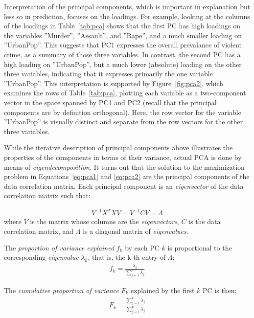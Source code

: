 Interpretation of the principal components, which is important in explanation but less so in prediction, focuses on the loadings. For example, looking at the columns of the loadings in Table~\ref{tab:pca} shows that the first PC has high loadings on the variables ''Murder'', ''Assault'', and ''Rape'', and a much smaller loading on ''UrbanPop''. This suggests that PC1 expresses the overall prevalance of violent crime, as a summary of those three variables. In contrast, the second PC has a high loading on ''UrbanPop'', but a much lower (absolute) loading on the other three variables, indicating that it expresses primarily the one variable ''UrbanPop''. This interpretation is supported by Figure~\ref{fig:pca2}, which examines the rows of Table~\ref{tab:pca}, plotting each variable as a two-component vector in the space spanned by PC1 and PC2 (recall that the principal components are by definition orthogonal). Here, the row vector for the variable ''UrbanPop'' is visually distinct and separate from the row vectors for the other three variables. 

While the iterative description of principal components above illustrates the properties of the components in terms of their variance, actual PCA is done by means of \emph{eigendecomposition}. It turns out that the solution to the maximization problem in Equations~\ref{eq:pca1} and \ref{eq:pca2} are the principal components of the data correlation matrix. Each principal component is an \emph{eigenvector} of the data correlation matrix such that:

\begin{align*}
 V^{-1} X^T X V = V^{-1}CV = \Lambda
\end{align*}
\noindent where $V$ is the matrix whose columns are the \emph{eigenvectors}, $C$ is the data correlation matrix, and $\Lambda$ is a diagonal matrix of \emph{eigenvalues}.

\noindent The \emph{proportion of variance explained} $f_k$ by each PC $k$ is proportional to the corresponding \emph{eigenvalue} $\lambda_k$, that is, the k-th entry of $\Lambda$:
\begin{align*}
f_k = \frac{\lambda_k}{\sum_{j=1}^p \lambda_{j}} 
\end{align*}

\noindent The \emph{cumulative proportion of variance} $F_k$ explained by the first $k$ PC is then:
\begin{align*}
F_k = \frac{\sum_{j=1}^k \lambda_j}{\sum_{j=1}^p \lambda_{j}}
\end{align*}

